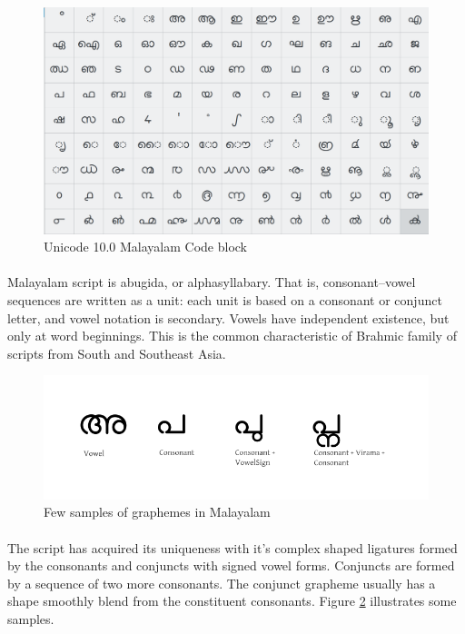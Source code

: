 \documentclass[10pt]{article}
\begin{document}
\begin{figure}[h!]
	\centering
	\includegraphics[scale=0.2]{images/unicodeml.png}
	\caption{Unicode 10.0 Malayalam Code block}
	\label{unicode}
\end{figure} 


\paragraph{}
Malayalam script is abugida, or alphasyllabary. That is, consonant–vowel sequences are written as a unit: each unit is based on a consonant or conjunct letter, and vowel notation is secondary. Vowels have independent existence, but only at word beginnings. This is the common characteristic of Brahmic family of scripts from South and Southeast Asia.


\begin{figure}[h!]
	\centering
	\includegraphics[scale=0.4]{images/malayalamExamples.png}
	\caption{Few samples of graphemes in Malayalam}
	\label{malayalamsamples}
\end{figure} 


\paragraph{}
The script has acquired its uniqueness with it's complex shaped ligatures formed by the consonants and conjuncts with signed vowel forms. Conjuncts are formed by a sequence of two more consonants. The conjunct grapheme usually has a shape smoothly blend from the constituent consonants. Figure \ref{malayalamsamples} illustrates some samples.
\end{document}
